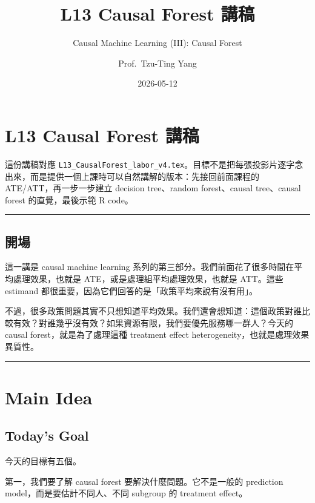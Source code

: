 \documentclass[
  chinese,
  11pt,
]{article}
\title{L13 Causal Forest 講稿}
\subtitle{Causal Machine Learning (III): Causal Forest}
\author{Prof.~Tzu-Ting Yang}
\date{2026-05-12}
\begin{document}
\maketitle

\renewcommand*\contentsname{目錄}
{
\setcounter{tocdepth}{3}
\tableofcontents
}
\section{L13 Causal Forest 講稿}\label{l13-causal-forest-ux8b1bux7a3f}

這份講稿對應
\texttt{L13\_CausalForest\_labor\_v4.tex}。目標不是把每張投影片逐字念出來，而是提供一個上課時可以自然講解的版本：先接回前面課程的
ATE/ATT，再一步一步建立 decision tree、random forest、causal
tree、causal forest 的直覺，最後示範 R code。

\begin{center}\rule{0.5\linewidth}{0.5pt}\end{center}

\subsection{開場}\label{ux958bux5834}

這一講是 causal machine learning
系列的第三部分。我們前面花了很多時間在平均處理效果，也就是
ATE，或是處理組平均處理效果，也就是 ATT。這些 estimand
都很重要，因為它們回答的是「政策平均來說有沒有用」。

不過，很多政策問題其實不只想知道平均效果。我們還會想知道：這個政策對誰比較有效？對誰幾乎沒有效？如果資源有限，我們要優先服務哪一群人？今天的
causal forest，就是為了處理這種 treatment effect
heterogeneity，也就是處理效果異質性。

\begin{center}\rule{0.5\linewidth}{0.5pt}\end{center}

\section{Main Idea}\label{main-idea}

\subsection{Today's Goal}\label{todays-goal}

今天的目標有五個。

第一，我們要了解 causal forest 要解決什麼問題。它不是一般的 prediction
model，而是要估計不同人、不同 subgroup 的 treatment effect。
\end{document}
